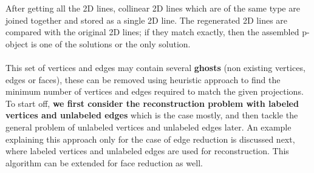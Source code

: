 \documentclass[
11pt, %
english, %
singlespacing, %
headsepline, %
]{MastersDoctoralThesis} %
\begin{document}
After getting all the 2D lines, collinear 2D lines which are of the same type are joined together and stored as a single 2D line. The regenerated 2D lines
are compared with the original 2D lines; if they match exactly, then the assembled p-object is one of the solutions or the only solution.\\ \\
This set of vertices and edges may contain several \textbf{ghosts} (non existing vertices, edges or faces), these can be removed using heuristic approach to find the minimum number of vertices and edges required to match the given projections. To start off,\textbf{ we first consider the reconstruction problem with labeled vertices and unlabeled edges} which is the case mostly, and then tackle the general problem of unlabeled vertices and unlabeled edges later. An example explaining this approach only for the case of edge reduction is discussed next, where labeled vertices and unlabeled edges are used for reconstruction. This algorithm can be extended for face reduction as well. 
\end{document}
